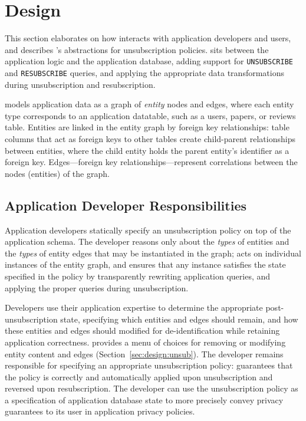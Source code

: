 \section{Design}
This section elaborates on how \proto interacts with application developers and users, and describes
\proto's abstractions for unsubscription policies.
\proto sits between the application logic and the application database, adding support for
\texttt{UNSUBSCRIBE} and \texttt{RESUBSCRIBE} queries, and applying the appropriate data transformations
during unsubscription and resubscription.

\proto models application data as a graph of \emph{entity}
nodes and edges, where each entity type corresponds to an application datatable, such as a users,
papers, or reviews table.  Entities are linked in the entity graph by foreign key relationships:
table columns that act as foreign keys to other tables create child-parent relationships between
entities, where the child entity holds the parent entity's identifier as a foreign key. 
Edges---foreign key relationships---represent correlations between the nodes (entities) of the
graph.

\subsection{Application Developer Responsibilities}
Application developers statically specify an unsubscription policy on top of the application schema.
The developer reasons only about the \emph{types} of entities
and the \emph{types} of entity edges that may be instantiated in the graph; \proto acts on individual
instances of the entity graph, and ensures that any instance satisfies the state specified in the
policy by transparently rewriting application queries, and applying the proper queries during
unsubscription.

Developers use their application expertise to determine the appropriate post-unsubscription state,
specifying which entities and edges should remain, and how these entities and edges should modified
for de-identification while retaining application correctness. \proto provides a menu of choices  
for removing or modifying entity content and edges (Section~\ref{sec:design:unsub}).
The developer remains responsible for specifying an appropriate unsubscription policy: \proto
guarantees that the policy is correctly and automatically applied upon unsubscription and reversed
upon resubscription. The developer can use the unsubscription policy as a specification of
application database state to more precisely convey privacy guarantees to its user in \eg
application privacy policies.


